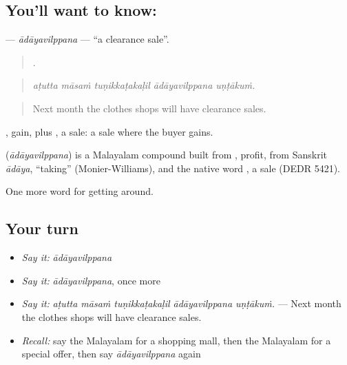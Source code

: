 \subsection*{You'll want to know: }
\textbf{} — \emph{ādāyavilppana} — \textquotedblleft{}a clearance sale\textquotedblright{}.

\begin{quote}
    .
\end{quote}

\begin{quote}
\emph{aṭutta māsaṁ tuṇikkaṭakaḷil ādāyavilppana uṇṭākuṁ.}
\end{quote}

\begin{quote}
Next month the clothes shops will have clearance sales.
\end{quote}

, gain, plus , a sale: a sale where the buyer gains.

\begin{cousinweb}
\textbf{} (\emph{ādāyavilppana}) is a Malayalam compound built from , profit, from Sanskrit \emph{ādāya}, \textquotedblleft{}taking\textquotedblright{} (Monier-Williams), and the native word , a sale (DEDR 5421).
\end{cousinweb}

\begin{grammarlens}[title={What you've built}]
One more word for getting around.
\end{grammarlens}

\subsection*{Your turn}
\begin{itemize}
\raggedright
  \item \emph{Say it:} \emph{ādāyavilppana}
  \item \emph{Say it:} \emph{ādāyavilppana}, once more
  \item \emph{Say it:} \emph{aṭutta māsaṁ tuṇikkaṭakaḷil ādāyavilppana uṇṭākuṁ.} — Next month the clothes shops will have clearance sales.
  \item \emph{Recall:} say the Malayalam for a shopping mall, then the Malayalam for a special offer, then say \emph{ādāyavilppana} again
\end{itemize}

